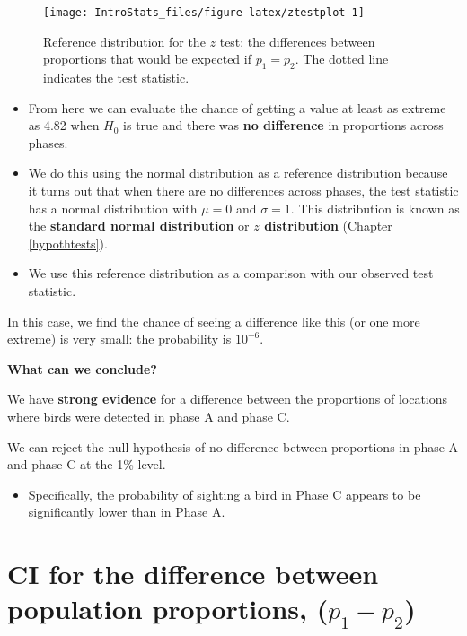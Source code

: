 \documentclass[
  oneside]{krantz}
\providecommand{\tightlist}{%
  \setlength{\itemsep}{0pt}\setlength{\parskip}{0pt}}
\begin{document}
\begin{figure}

{\centering \texttt{[image: IntroStats\_files/figure-latex/ztestplot-1]} 

}

\caption{Reference distribution for the $z$ test: the  differences between proportions that would be expected if $p_1=p_2$. The dotted line indicates the test statistic.}\label{fig:ztestplot}
\end{figure}

\begin{itemize}
\item
  From here we can evaluate the chance of getting a value at least as extreme as 4.82 when \(H_0\) is true and there was \textbf{no difference} in proportions across phases.
\item
  We do this using the normal distribution as a reference distribution because it turns out that when there are no differences across phases, the test statistic has a normal distribution with \(\mu=0\) and \(\sigma=1\). This distribution is known as the \textbf{standard normal distribution} or \textbf{\(z\) distribution} (Chapter \ref{hypothtests}).
\item
  We use this reference distribution as a comparison with our observed test statistic.
\end{itemize}

In this case, we find the chance of seeing a difference like this (or one more extreme) is very small: the probability is \(\ensuremath{10^{-6}}\).

\textbf{What can we conclude?}

We have \textbf{strong evidence} for a difference between the proportions of locations where birds were detected in phase A and phase C.

We can reject the null hypothesis of no difference between proportions in phase A and phase C at the 1\% level.

\begin{itemize}
\tightlist
\item
  Specifically, the probability of sighting a bird in Phase C appears to be significantly lower than in Phase A.
\end{itemize}

\hypertarget{ci-for-the-difference-between-population-proportions-p_1-p_2}{%
\section{\texorpdfstring{CI for the difference between population proportions, (\(p_1-p_2\))}{CI for the difference between population proportions, (p\_1-p\_2)}}\label{ci-for-the-difference-between-population-proportions-p_1-p_2}}
\end{document}
